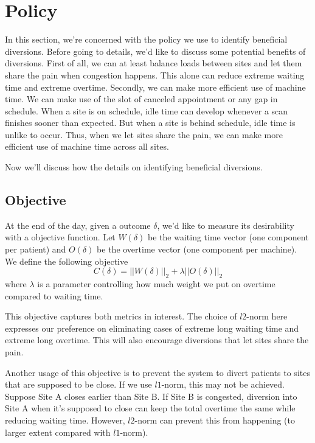\section{Policy}

In this section, we're concerned with the policy we use to identify
beneficial diversions. Before going to details, we'd like to discuss
some potential benefits of diversions. First of all, we can at least
balance loads between sites and let them share the pain when congestion
happens. This alone can reduce extreme waiting time and extreme overtime.
Secondly, we can make more efficient use of machine time. We can make
use of the slot of canceled appointment or any gap in schedule.
When a site is on schedule, idle time can develop whenever a scan finishes
sooner than expected. But when a site is behind schedule, idle time is
unlike to occur. Thus, when we let sites share the pain, we can make
more efficient use of machine time across all sites.

Now we'll discuss how the details on identifying beneficial diversions.

\subsection{Objective}

At the end of the day, given a outcome $\delta$, we'd like to measure
its desirability with a objective function. Let $W(\delta)$ be the
waiting time vector (one component per patient) and $O(\delta)$ be the overtime
vector (one component per machine). We define the following objective
\[  C(\delta) = ||W(\delta)||_2 + \lambda ||O(\delta)||_2 \]
where $\lambda$ is a parameter controlling how much weight
we put on overtime compared to waiting time.

This objective captures both metrics in interest. The choice of
$l2$-norm here expresses our preference on eliminating cases of
extreme long waiting time and extreme long overtime. This will
also encourage diversions that let sites share the pain.

Another usage of this objective is to prevent the system to
divert patients to sites that are supposed to be close.
If we use $l1$-norm, this may not be achieved. Suppose Site A
closes earlier than Site B. If Site B is congested, diversion
into Site A when it's supposed to close can keep the total
overtime the same while reducing waiting time. However,
$l2$-norm can prevent this from happening (to larger extent
compared with $l1$-norm).

